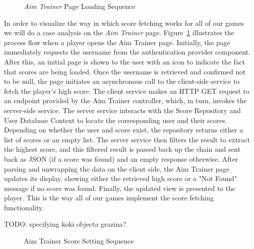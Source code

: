 \documentclass[11pt,a4paper]{article}
\newcommand{\inputdiagram}[1]{}
\begin{document}
\begin{figure}[H]
    \centering
     \begin{adjustbox}{width=0.92\paperwidth,center}       \inputdiagram{aim_trainer_page_sequence.tex}
     \end{adjustbox}
     \caption{\textit{Aim Trainer} Page Loading Sequence}
    \label{fig:aim_trainer_page_sequence}
\end{figure}
In order to visualize the way in which score fetching works for all of
our games we will do a case analysis on the \textit{Aim Trainer} page.
Figure~\ref{fig:aim_trainer_page_sequence} illustrates the process flow
when a player opens the Aim Trainer page. Initially, the page immediately
requests the username from the authentication provider component. After
this, an initial page is shown to the user with an icon to indicate the fact
that scores are being loaded. Once the username is retrieved and confirmed
not to be null, the page initiates an asynchronous call to the client-side
service to fetch the player's high score. The client service makes an HTTP GET
request to an endpoint provided by the Aim Trainer controller, which, in turn,
invokes the server-side service. The server service interacts with the Score
Repository and User Database Context to locate the corresponding user and
their scores. Depending on whether the user and score exist, the repository
returns either a list of scores or an empty list. The server service then
filters the result to extract the highest score, and this filtered result
is passed back up the chain and sent back as JSON (if a score was found)
and an empty response otherwise. After parsing and unwrapping the data on
the client side, the Aim Trainer page updates its display, showing either the
retrieved high score or a "Not Found" message if no score was found. Finally,
the updated view is presented to the player. This is the way all of our
games implement the score fetching functionality.

TODO: specifying koki objecta grazina?

\begin{figure}[H]
    \centering
     \begin{adjustbox}{width=0.92\paperwidth,center}
        \inputdiagram{aim_trainer_set_score_sequence.tex}
     \end{adjustbox}
    \caption{Aim Trainer Score Setting Sequence}
    \label{fig:aim_trainer_set_score_sequence}
\end{figure}
\end{document}
